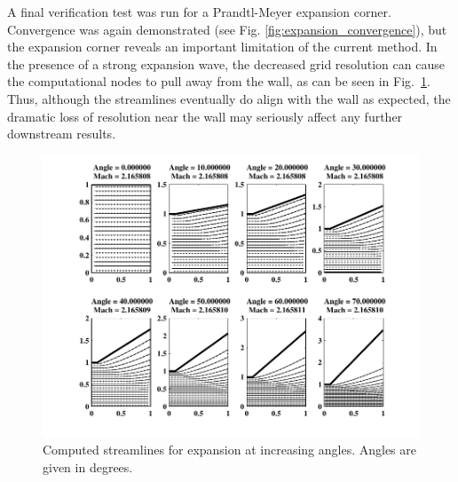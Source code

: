 \documentclass[12pt,letterpaper]{article}
\begin{document}
A final verification test was run for a Prandtl-Meyer expansion
corner. Convergence was again demonstrated (see
Fig. \ref{fig:expansion_convergence}), but the expansion corner
reveals an important limitation of the current method. 
In the presence of a strong expansion wave, the decreased grid resolution can cause the computational nodes to pull away from the wall, as can be seen in Fig.~\ref{fig:expansion_separation}. Thus, although the streamlines eventually do align with the wall as expected, the dramatic loss of resolution near the wall may seriously affect any further downstream results.

\begin{figure}[htbp] %
   \centering
   \includegraphics[width=\textwidth]{Expansion.pdf} 
   \caption[Computed Streamlines for Edxpansion at Increasing Angles]{Computed streamlines for expansion at increasing angles. Angles are given in degrees.}
   \label{fig:expansion_separation}

\end{figure}

\end{document}
